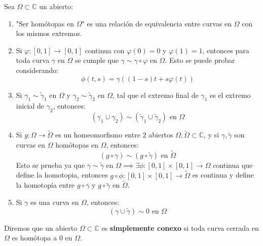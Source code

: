 \begin{proposición}
    Sea $\Omega \subset \mathbb{C}$ un abierto:
    \begin{enumerate}
        \item "Ser homótopas en $\Omega$" es una relación de equivalencia entre curvas en $\Omega$ con los mismos extremos.
        \item Si $\varphi : [0,1] \to [0,1]$ continua con $\varphi(0) = 0$ y $\varphi(1) = 1$, entonces para toda curva $\gamma$ en $\Omega$ se cumple que $\gamma \sim \gamma \circ \varphi$ en $\Omega$. Esto se puede probar considerando:
        \[
        \phi (t,s) = \gamma((1 - s)t + s \varphi(t))
        \]
        \item Si $\gamma_1 \sim \tilde{\gamma}_1$ en $\Omega$ y $\gamma_2 \sim \tilde{\gamma}_2$ en $\Omega$, tal que el extremo final de $\gamma_1$ es el extremo inicial de $\gamma_2$, entonces:
        \[
            \left( \gamma_1 \cup \gamma_2 \right) \sim \left( \tilde{\gamma}_1 \cup \tilde{\gamma}_2 \right) \text{ en } \Omega
        \]
        \item Si $g: \Omega \to \widetilde{\Omega}$ es un homeomorfismo entre $2$ abiertos $\Omega, \widetilde{\Omega} \subset \mathbb{C}$, y si $\gamma, \tilde{\gamma}$ son curvas en $\Omega$ homótopas en $\Omega$, entonces:
        \[
            \left( g \circ \gamma \right) \sim \left( g \circ \tilde{\gamma} \right) \text{ en } \widetilde{\Omega}
        \]
        Esto se prueba ya que $\gamma \sim \tilde{\gamma}$ en $\Omega \implies \exists \phi : [0,1] \times [0,1] \to \Omega$ continua que define la homotopia, entonces $g \circ \phi : [0,1] \times [0,1] \to \widetilde{\Omega}$ es continua y define la homotopía entre $g \circ \gamma$ y $g \circ \tilde{\gamma}$ en $\widetilde{\Omega}$.
        \item Si $\gamma$ es una curva en $\Omega$, entonces:
        \[
        \left( \gamma \cup \widetilde{\gamma} \right) \sim 0 \text{ en } \Omega
        \]
    \end{enumerate}
\end{proposición}

\begin{definición}
    Diremos que un abierto $\Omega \subset \mathbb{C}$ es \textbf{simplemente conexo} si toda curva cerrada en $\Omega$ es homótopa a $0$ en $\Omega$.
\end{definición}



